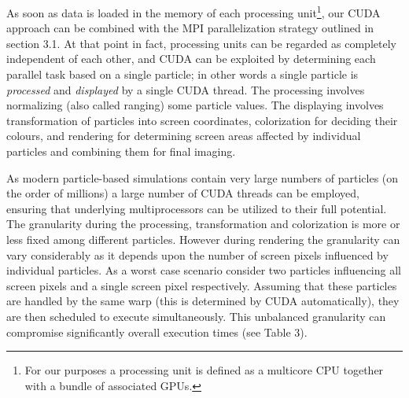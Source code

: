 \documentclass[1p,times]{elsarticle}
\begin{document}

As soon as data is loaded in the memory of each processing unit\footnote{For our purposes a processing unit is defined as a multicore CPU together with a bundle of associated GPUs.}, our CUDA approach can be combined with the MPI parallelization strategy outlined in section 3.1. At that point in fact, processing units can be regarded as completely independent of each other, and CUDA can be exploited by determining each parallel task based on a single particle; in other 
words a single particle is {\it processed} and {\it displayed} by a single CUDA thread. 
The processing involves normalizing (also called ranging) some particle values. 
The displaying involves transformation of particles into screen coordinates, colorization 
for deciding their colours, and rendering for determining screen areas affected by individual particles and combining them for final imaging.


As modern particle-based simulations contain very large numbers of particles 
(on the order of millions) a large number of CUDA threads can be employed,
ensuring that underlying multiprocessors can be utilized to their full potential. 
The granularity during the processing, transformation and colorization is more or 
less fixed among different particles. However during rendering the granularity 
can vary considerably as it depends upon the number of screen pixels influenced 
by individual particles. As a worst case scenario consider two particles influencing 
all screen pixels and a single screen pixel respectively. Assuming that these 
particles are handled by the same warp (this is determined by CUDA automatically), 
they are then scheduled to execute simultaneously. This unbalanced granularity 
can compromise significantly overall execution times (see Table 3).
\end{document}
